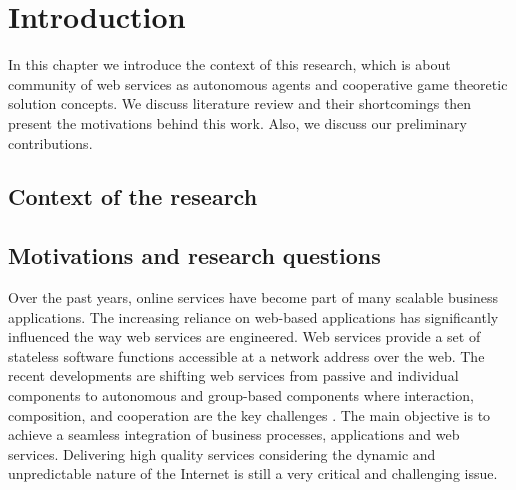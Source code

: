 \setcounter{chapter}{0}
\chapter{Introduction}\label{sec:intro}
In this chapter we introduce the context of this research, which is about community of web services as autonomous agents and cooperative game theoretic solution concepts. We discuss literature review and their shortcomings then present the motivations behind this work. Also, we discuss our preliminary contributions.

\section{Context of the research}\label{sec:context}


\section{Motivations and research questions}\label{sec:motivation}

Over the past years, online services have become part of many
scalable business applications. The increasing reliance on
web-based applications has significantly influenced the way web
services are engineered. Web services provide a set of stateless
software functions accessible at a network address over the web.
The recent developments are shifting web services from passive and
individual components to autonomous and group-based components
where interaction, composition, and cooperation are the key
challenges \cite{ICWS2011-1,SCC2011-1}. The main objective is to
achieve a seamless integration of business processes, applications
and web services. Delivering high quality services considering the
dynamic and unpredictable nature of the Internet is still a very
critical and challenging issue.

